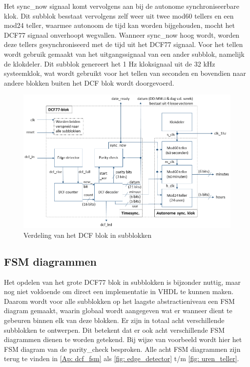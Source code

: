 \noindent Het sync\_now signaal komt vervolgens aan bij de autonome synchroniseerbare klok. Dit subblok besstaat vervolgens zelf weer uit twee mod60 tellers en een mod24 teller, waarmee autonoom de tijd kan worden bijgehouden, mocht het DCF77 signaal onverhoopt wegvallen. Wanneer sync\_now hoog wordt, worden deze tellers gesynchroniseerd met de tijd uit het DCF77 signaal. Voor het tellen wordt gebruik gemaakt van het uitgangssignaal van een ander subblok, namelijk de klokdeler. Dit subblok genereert het 1 Hz kloksignaal uit de 32 kHz systeemklok, wat wordt gebruikt voor het tellen van seconden en bovendien naar andere blokken buiten het DCF blok wordt doorgevoerd.

\begin{figure}[h!]
\begin{center}
\includegraphics[keepaspectratio=true,scale=0.75]{Figuren/DCF77/Blokdiagram.png}
\caption{Verdeling van het DCF blok in subblokken}
\label{fig: dcf_subblokken}
\end{center}
\end{figure}

\subsection{FSM diagrammen}
Het opdelen van het grote DCF77 blok in subblokken is bijzonder nuttig, maar nog niet voldoende om direct een implementatie in VHDL te kunnen maken. Daarom wordt voor alle subblokken op het laagste abstractieniveau een FSM diagram gemaakt, waarin globaal wordt aangegeven wat er wanneer dient te gebeuren binnen elk van deze blokken. Er zijn in totaal acht verschillende subblokken te ontwerpen. Dit betekent dat er ook acht verschillende FSM diagrammen dienen te worden getekend. Bij wijze van voorbeeld wordt hier het FSM diagram van de parity\_check besproken. Alle acht FSM diagrammen zijn terug te vinden in \cref{Ap: dcf_fsm} als \cref{fig: edge_detector} t/m \cref{fig: uren_teller}.\\

